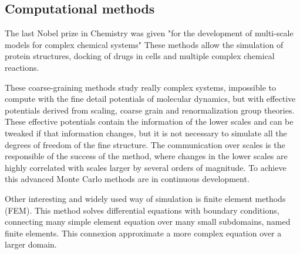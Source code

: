 \subsection{Computational methods}  
The last Nobel prize in Chemistry was given "for the development of multi-scale
models for complex chemical systems" \citep{nobel:chemistry2013} These methods
allow the simulation of protein structures,  docking of drugs in cells and
multiple complex chemical reactions.

These coarse-graining methods study really complex
systems,\citep{de_pablo_coarse-grained_2011} impossible to compute with  the
fine detail potentials of molecular dynamics, but with effective potentials 
derived from scaling, coarse grain and renormalization group theories. These
effective potentials contain the information of the lower scales and can be
tweaked if that information changes, but it is not necessary to simulate all the
degrees of freedom of the fine structure. The communication over scales is the
responsible of the success of the method, where changes in the lower scales are
highly correlated with scales larger by several orders of magnitude. To achieve
this advanced Monte Carlo methods are in continuous development.
\citep{karayiannis_novel_2002}

Other interesting and widely used way of simulation is finite element methods
(FEM). This method solves differential equations with boundary conditions,
connecting many simple element equation over many small subdomains, named finite
elements. This connexion approximate a more complex equation over a larger
domain.




